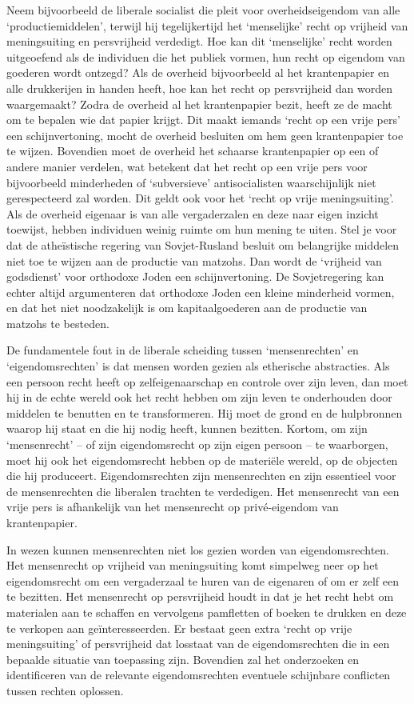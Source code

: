 \documentclass[
  a5paper,
  smalldemyvopaper,10pt,twoside,onecolumn,openright,extrafontsizes,hidelinks]{memoir}
\begin{document}
Neem bijvoorbeeld de liberale socialist die pleit voor overheidseigendom
van alle `productiemiddelen', terwijl hij tegelijkertijd het
`menselijke' recht op vrijheid van meningsuiting en persvrijheid
verdedigt. Hoe kan dit `menselijke' recht worden uitgeoefend als de
individuen die het publiek vormen, hun recht op eigendom van goederen
wordt ontzegd? Als de overheid bijvoorbeeld al het krantenpapier en alle
drukkerijen in handen heeft, hoe kan het recht op persvrijheid dan
worden waargemaakt? Zodra de overheid al het krantenpapier bezit, heeft
ze de macht om te bepalen wie dat papier krijgt. Dit maakt iemands
`recht op een vrije pers' een schijnvertoning, mocht de overheid
besluiten om hem geen krantenpapier toe te wijzen. Bovendien moet de
overheid het schaarse krantenpapier op een of andere manier verdelen,
wat betekent dat het recht op een vrije pers voor bijvoorbeeld
minderheden of `subversieve' antisocialisten waarschijnlijk niet
gerespecteerd zal worden. Dit geldt ook voor het `recht op vrije
meningsuiting'. Als de overheid eigenaar is van alle vergaderzalen en
deze naar eigen inzicht toewijst, hebben individuen weinig ruimte om hun
mening te uiten. Stel je voor dat de atheïstische regering van
Sovjet-Rusland besluit om belangrijke middelen niet toe te wijzen aan de
productie van matzohs. Dan wordt de `vrijheid van godsdienst' voor
orthodoxe Joden een schijnvertoning. De Sovjetregering kan echter altijd
argumenteren dat orthodoxe Joden een kleine minderheid vormen, en dat
het niet noodzakelijk is om kapitaalgoederen aan de productie van
matzohs te besteden.

De fundamentele fout in de liberale scheiding tussen `mensenrechten' en
`eigendomsrechten' is dat mensen worden gezien als etherische
abstracties. Als een persoon recht heeft op zelfeigenaarschap en
controle over zijn leven, dan moet hij in de echte wereld ook het recht
hebben om zijn leven te onderhouden door middelen te benutten en te
transformeren. Hij moet de grond en de hulpbronnen waarop hij staat en
die hij nodig heeft, kunnen bezitten. Kortom, om zijn `mensenrecht' --
of zijn eigendomsrecht op zijn eigen persoon -- te waarborgen, moet hij
ook het eigendomsrecht hebben op de materiële wereld, op de objecten die
hij produceert. Eigendomsrechten zijn mensenrechten en zijn essentieel
voor de mensenrechten die liberalen trachten te verdedigen. Het
mensenrecht van een vrije pers is afhankelijk van het mensenrecht op
privé-eigendom van krantenpapier.

In wezen kunnen mensenrechten niet los gezien worden van
eigendomsrechten. Het mensenrecht op vrijheid van meningsuiting komt
simpelweg neer op het eigendomsrecht om een vergaderzaal te huren van de
eigenaren of om er zelf een te bezitten. Het mensenrecht op persvrijheid
houdt in dat je het recht hebt om materialen aan te schaffen en
vervolgens pamfletten of boeken te drukken en deze te verkopen aan
geïnteresseerden. Er bestaat geen extra `recht op vrije meningsuiting'
of persvrijheid dat losstaat van de eigendomsrechten die in een bepaalde
situatie van toepassing zijn. Bovendien zal het onderzoeken en
identificeren van de relevante eigendomsrechten eventuele schijnbare
conflicten tussen rechten oplossen.
\end{document}
